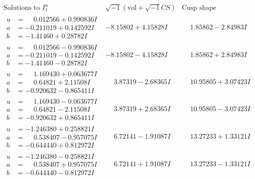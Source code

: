 \documentclass[1p]{elsarticle_modified}
\theoremstyle{definition}
\newcommand{\I}{\sqrt{-1}}
\begin{document}
$$\begin{array}{c|c|c}  
\text{Solutions to }I^u_{1}& \I (\text{vol} + \sqrt{-1}CS) & \text{Cusp shape}\\
 \hline 
\begin{aligned}
u &= \phantom{-}0.012566 + 0.990836 I \\
a &= -0.211019 + 0.142592 I \\
b &= -1.41460 + 0.28782 I\end{aligned}
 & -8.15802 + 4.15828 I & \phantom{-}1.85862 - 2.84983 I \\ \hline\begin{aligned}
u &= \phantom{-}0.012566 - 0.990836 I \\
a &= -0.211019 - 0.142592 I \\
b &= -1.41460 - 0.28782 I\end{aligned}
 & -8.15802 - 4.15828 I & \phantom{-}1.85862 + 2.84983 I \\ \hline\begin{aligned}
u &= \phantom{-}1.169430 + 0.063677 I \\
a &= \phantom{-}0.64821 + 2.11508 I \\
b &= -0.920632 - 0.865411 I\end{aligned}
 & \phantom{-}3.87319 - 2.68365 I & \phantom{-}10.95805 + 3.07423 I \\ \hline\begin{aligned}
u &= \phantom{-}1.169430 - 0.063677 I \\
a &= \phantom{-}0.64821 - 2.11508 I \\
b &= -0.920632 + 0.865411 I\end{aligned}
 & \phantom{-}3.87319 + 2.68365 I & \phantom{-}10.95805 - 3.07423 I \\ \hline\begin{aligned}
u &= -1.246380 + 0.258821 I \\
a &= \phantom{-}0.538407 - 0.957075 I \\
b &= -0.644440 + 0.812972 I\end{aligned}
 & \phantom{-}6.72141 - 1.91087 I & \phantom{-}13.27233 + 1.33121 I \\ \hline\begin{aligned}
u &= -1.246380 - 0.258821 I \\
a &= \phantom{-}0.538407 + 0.957075 I \\
b &= -0.644440 - 0.812972 I\end{aligned}
 & \phantom{-}6.72141 + 1.91087 I & \phantom{-}13.27233 - 1.33121 I \\ \hline\begin{aligned}

\end{aligned}
\end{array}$$
\end{document}
